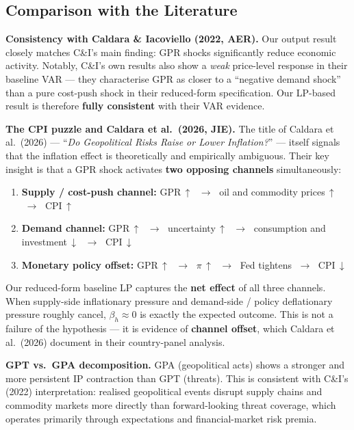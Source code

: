\documentclass[11pt,a4paper]{article}
\begin{document}
\subsection{Comparison with the Literature}

\noindent\textbf{Consistency with Caldara \& Iacoviello (2022, AER).} Our output result closely matches C\&I's main finding: GPR shocks significantly reduce economic activity. Notably, C\&I's own results also show a \textit{weak} price-level response in their baseline VAR --- they characterise GPR as closer to a ``negative demand shock'' than a pure cost-push shock in their reduced-form specification. Our LP-based result is therefore \textbf{fully consistent} with their VAR evidence.

\medskip
\noindent\textbf{The CPI puzzle and Caldara et al.\ (2026, JIE).} The title of Caldara et al.\ (2026) --- ``\textit{Do Geopolitical Risks Raise or Lower Inflation?}'' --- itself signals that the inflation effect is theoretically and empirically ambiguous. Their key insight is that a GPR shock activates \textbf{two opposing channels} simultaneously:

\begin{enumerate}[itemsep=2pt]
    \item \textbf{Supply / cost-push channel:} GPR\,$\uparrow$ $\;\to\;$ oil and commodity prices\,$\uparrow$ $\;\to\;$ CPI\,$\uparrow$
    \item \textbf{Demand channel:} GPR\,$\uparrow$ $\;\to\;$ uncertainty\,$\uparrow$ $\;\to\;$ consumption and investment\,$\downarrow$ $\;\to\;$ CPI\,$\downarrow$
    \item \textbf{Monetary policy offset:} GPR\,$\uparrow$ $\;\to\;$ $\pi$\,$\uparrow$ $\;\to\;$ Fed tightens $\;\to\;$ CPI\,$\downarrow$
\end{enumerate}

\noindent Our reduced-form baseline LP captures the \textbf{net effect} of all three channels. When supply-side inflationary pressure and demand-side / policy deflationary pressure roughly cancel, $\beta_h \approx 0$ is exactly the expected outcome. This is not a failure of the hypothesis --- it is evidence of \textbf{channel offset}, which Caldara et al.\ (2026) document in their country-panel analysis.

\medskip
\noindent\textbf{GPT vs.\ GPA decomposition.} GPA (geopolitical acts) shows a stronger and more persistent IP contraction than GPT (threats). This is consistent with C\&I's (2022) interpretation: realised geopolitical events disrupt supply chains and commodity markets more directly than forward-looking threat coverage, which operates primarily through expectations and financial-market risk premia.
\end{document}
